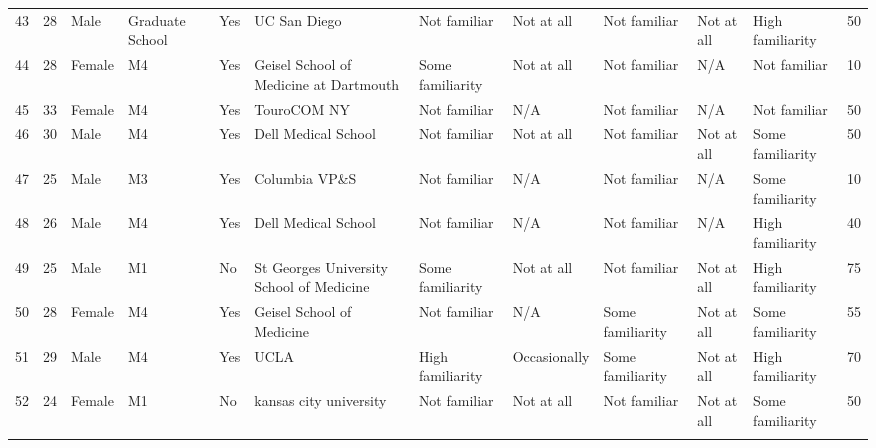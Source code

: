 \documentclass[11pt]{article}
\begin{document}
\begin{landscape}
{\begin{longtable}{rlllllllllll}
43 & 28 & Male & Graduate School & Yes & UC San Diego & Not familiar & Not at all & Not familiar & Not at all & High familiarity & 50 \\
44 & 28 & Female & M4 & Yes & Geisel School of Medicine at Dartmouth & Some familiarity & Not at all & Not familiar & N/A & Not familiar & 10 \\
45 & 33 & Female & M4 & Yes & TouroCOM NY & Not familiar & N/A & Not familiar & N/A & Not familiar & 50 \\
46 & 30 & Male & M4 & Yes & Dell Medical School & Not familiar & Not at all & Not familiar & Not at all & Some familiarity & 50 \\
47 & 25 & Male & M3 & Yes & Columbia VP\&S & Not familiar & N/A & Not familiar & N/A & Some familiarity & 10 \\
48 & 26 & Male & M4 & Yes & Dell Medical School & Not familiar & N/A & Not familiar & N/A & High familiarity & 40 \\
49 & 25 & Male & M1 & No & St Georges University School of Medicine & Some familiarity & Not at all & Not familiar & Not at all & High familiarity & 75 \\
50 & 28 & Female & M4 & Yes & Geisel School of Medicine & Not familiar & N/A & Some familiarity & Not at all & Some familiarity & 55 \\
51 & 29 & Male & M4 & Yes & UCLA & High familiarity & Occasionally & Some familiarity & Not at all & High familiarity & 70 \\
52 & 24 & Female & M1 & No & kansas city university & Not familiar & Not at all & Not familiar & Not at all & Some familiarity & 50 \\
\label{demographic}
\end{longtable}
}
\end{landscape}
\end{document}

